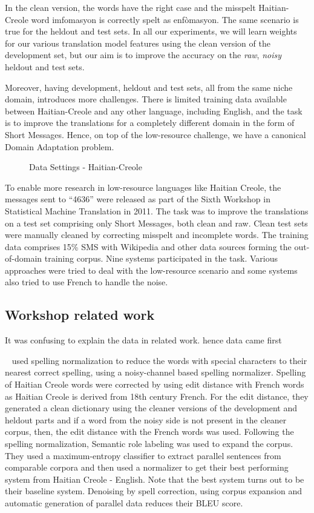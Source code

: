 	In the clean version, the words have the right case and the misspelt Haitian-Creole word imfomasyon is correctly spelt as enf\`{o}masyon. The same scenario is true for the heldout and test sets. In all our experiments, we will learn weights for our various translation model features using the clean version of the development set, but our aim is to improve the accuracy on the \emph{raw}, \emph{noisy} heldout and test sets. 

	Moreover, having development, heldout and test sets, all from the same niche domain, introduces more challenges. There is limited training data available between Haitian-Creole and any other language, including English, and the task is to improve the translations for a completely different domain in the form of Short Messages. Hence, on top of the low-resource challenge, we have a canonical Domain Adaptation problem. 


	\begin{figure}[ht]
		\small
		\centering
		\label{fig:haiti_data_settings}
		
		\caption{Data Settings - Haitian-Creole}
	\end{figure}

To enable more research in low-resource languages like Haitian Creole, the messages sent to ``4636'' were released as part of the Sixth Workshop in Statistical Machine Translation in 2011. The task was to improve the translations on a test set comprising only Short Messages, both clean and raw. Clean test sets were manually cleaned by correcting misspelt and incomplete words. The training data comprises 15\% SMS with Wikipedia and other data sources forming the out-of-domain training corpus. Nine systems participated in the task. Various approaches were tried to deal with the low-resource scenario and some systems also tried to use French to handle the noise. 

\subsection{Workshop related work}
\alert{It was confusing to explain the data in related work. hence data came first}

 ~\cite{Sanjika:11} used spelling normalization to reduce the words with special characters to their nearest correct spelling, using a noisy-channel based spelling normalizer. Spelling of Haitian Creole words were corrected by using edit distance with French words as Haitian Creole is derived from 18th century French. For the edit distance, they generated a clean dictionary using the cleaner versions of the development and heldout  parts and if a word from the noisy side is not present in the cleaner corpus, then, the edit distance with the French words was used. Following the spelling normalization, Semantic role labeling was used to expand the corpus. They used a maximum-entropy classifier to extract parallel sentences from comparable corpora and then used a normalizer to get their best performing system from Haitian Creole - English. Note that the best system turns out to be their baseline system. Denoising by spell correction, using corpus expansion and automatic generation of parallel data reduces their BLEU score. 


